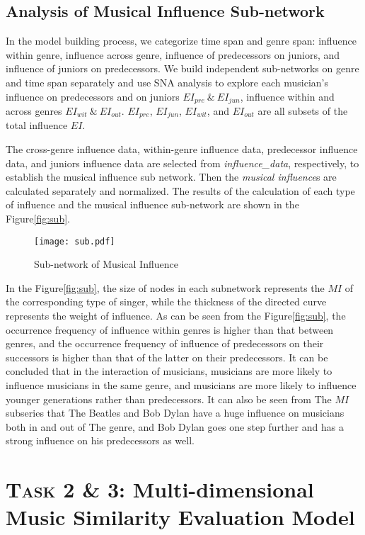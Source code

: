 \documentclass[12pt]{article}  %
\begin{document}
\subsection{Analysis of Musical Influence Sub-network}
In the model building process, we categorize time span and genre span: influence within genre, influence across genre, influence of predecessors on juniors, and influence of juniors on predecessors. We build independent sub-networks on genre and time span separately and use SNA analysis to explore each musician's influence on predecessors and on juniors $EI_{pre}\ \text{\&}\ EI_{jun}$, influence within and across genres $EI_{wit}\ \text{\&}\ EI_{out}$. $EI_{pre}$, $EI_{jun}$, $EI_{wit}$, and $EI_{out}$ are all subsets of the total influence $EI$.

The cross-genre influence data, within-genre influence data, predecessor influence data, and juniors influence data are selected from \emph{influence\_data}, respectively, to establish the musical influence sub network. Then the \emph{musical influence}s are  calculated separately and normalized. The results of the calculation of each type of influence and the musical influence sub-network are shown in the Figure\eqref{fig:sub}.

\begin{figure}[htbp]
	\centering
	\texttt{[image: sub.pdf]}
	\caption{Sub-network of Musical Influence}\label{fig:sub}
\end{figure}

In the Figure\eqref{fig:sub}, the size of nodes in each subnetwork represents the $MI$ of the corresponding type of singer, while the thickness of the directed curve represents the weight of influence. As can be seen from the Figure\eqref{fig:sub}, the occurrence frequency of influence within genres is higher than that between genres, and the occurrence frequency of influence of predecessors on their successors is higher than that of the latter on their predecessors. It can be concluded that in the interaction of musicians, musicians are more likely to influence musicians in the same genre, and musicians are more likely to influence younger generations rather than predecessors. It can also be seen from The $MI$ subseries that The Beatles and Bob Dylan have a huge influence on musicians both in and out of The genre, and Bob Dylan goes one step further and has a strong influence on his predecessors as well.
\vspace{-0.5cm}
\section{\textsc{Task} 2 \& 3: Multi-dimensional Music Similarity Evaluation Model}
\vspace{-0.4cm}
\end{document}
